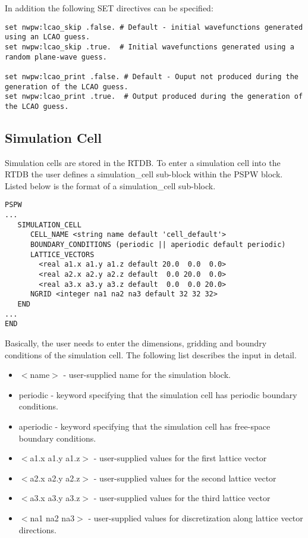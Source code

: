 In addition the following SET directives can be specified:
\begin{verbatim}
set nwpw:lcao_skip .false. # Default - initial wavefunctions generated using an LCAO guess. 
set nwpw:lcao_skip .true.  # Initial wavefunctions generated using a random plane-wave guess.

set nwpw:lcao_print .false. # Default - Ouput not produced during the generation of the LCAO guess. 
set nwpw:lcao_print .true.  # Output produced during the generation of the LCAO guess. 
\end{verbatim}


\subsection{Simulation Cell}
\label{sec:pspw_cell}
Simulation cells are stored in the RTDB.  To enter a  simulation cell
into the RTDB the user defines a simulation\_cell sub-block within the PSPW 
block.  Listed below is the format of a simulation\_cell sub-block.
\begin{verbatim}
PSPW
...
   SIMULATION_CELL
      CELL_NAME <string name default 'cell_default'>
      BOUNDARY_CONDITIONS (periodic || aperiodic default periodic)
      LATTICE_VECTORS
        <real a1.x a1.y a1.z default 20.0  0.0  0.0>
        <real a2.x a2.y a2.z default  0.0 20.0  0.0>
        <real a3.x a3.y a3.z default  0.0  0.0 20.0>
      NGRID <integer na1 na2 na3 default 32 32 32>
   END
...
END
\end{verbatim}
Basically, the user needs to enter the dimensions, gridding and boundry
conditions of the simulation cell.  The following list describes the 
input in detail.
\begin{itemize}
        \item $<$name$>$ - user-supplied name for the simulation block.
        \item periodic - keyword specifying that the simulation cell 
                         has periodic boundary conditions.      
        \item aperiodic - keyword specifying that the simulation cell
                          has free-space boundary conditions. 
        \item $<$a1.x a1.y a1.z$>$ - user-supplied values for the first 
                                   lattice vector 
        \item $<$a2.x a2.y a2.z$>$ - user-supplied values for the second 
                                   lattice vector
        \item $<$a3.x a3.y a3.z$>$ - user-supplied values for the third 
                                   lattice vector
        \item $<$na1 na2 na3$>$ - user-supplied values for discretization 
                                along lattice vector directions.
\end{itemize}

